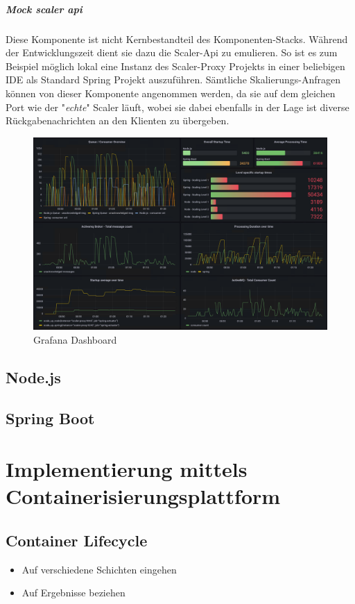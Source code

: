 \subparagraph{Mock scaler api}
Diese Komponente ist nicht Kernbestandteil des Komponenten-Stacks. Während der Entwicklungszeit dient sie dazu die Scaler-Api zu emulieren. So ist es zum Beispiel möglich lokal eine Instanz des Scaler-Proxy Projekts in einer beliebigen IDE als Standard Spring Projekt auszuführen. Sämtliche Skalierungs-Anfragen können von dieser Komponente angenommen werden, da sie auf dem gleichen Port wie der "\emph{echte}" Scaler läuft, wobei sie dabei ebenfalls in der Lage ist diverse Rückgabenachrichten an den Klienten zu übergeben.



\begin{figure}
	\centering
	\includegraphics[width=\linewidth]{kapitel/problemloesung/implementierung/_img/grafana-dashboard-01}
	\caption[]{Grafana Dashboard}
	\label{fig:grafanaOverview}
\end{figure}




\subsection{Node.js}
\subsection{Spring Boot}

\section{Implementierung mittels Containerisierungsplattform}
\subsection{Container Lifecycle}
\begin{itemize}
  \item Auf verschiedene Schichten eingehen
  \item Auf Ergebnisse beziehen
\end{itemize}
